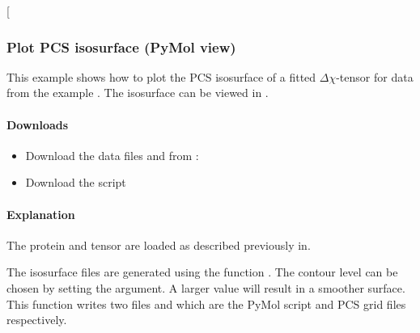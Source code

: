 \documentclass[a4paper,10pt,english]{sphinxmanual}
\begin{document}
 {[}\sphinxcode{\sphinxupquote{pcs\_fit.png}}{]}

\noindent{}


\subsubsection{Plot PCS isosurface (PyMol view)}
\label{\detokenize{examples/pcs_plot_isosurface:plot-pcs-isosurface-pymol-view}}\label{\detokenize{examples/pcs_plot_isosurface:pcs-plot-isosurface}}\label{\detokenize{examples/pcs_plot_isosurface::doc}}
This example shows how to plot the PCS isosurface of a fitted \({\Delta\chi}\)-tensor for data from the example {\hyperref[\detokenize{examples/pcs_fit:pcs-fit}]{}}. The isosurface can be viewed in .


\paragraph{Downloads}
\label{\detokenize{examples/pcs_plot_isosurface:downloads}}\begin{itemize}
\item {} 
Download the data files  and  from :

\item {} 
Download the script 

\end{itemize}


\paragraph{Explanation}
\label{\detokenize{examples/pcs_plot_isosurface:explanation}}
The protein and tensor are loaded as described previously in.

The isosurface files are generated using the function {\hyperref[\detokenize{reference/generated/paramagpy.metal.Metal.isomap:paramagpy.metal.Metal.isomap}]{}}. The contour level can be chosen by setting the  argument. A larger  value will result in a smoother surface. This function writes two files  and  which are the PyMol script and PCS grid files respectively.
\end{document}
